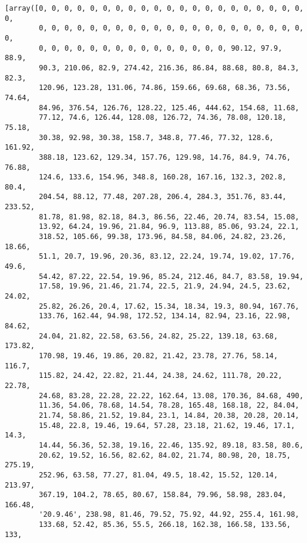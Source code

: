 \documentclass[11pt]{article}
\makeatletter
\newcommand{\boxspacing}{\kern\kvtcb@left@rule\kern\kvtcb@boxsep}
\newcommand{\prompt}[4]{
        {\ttfamily\llap{{\color{#2}[#3]:\hspace{3pt}#4}}\vspace{-\baselineskip}}
    }
\makeatother
\begin{document}
            \begin{tcolorbox}[breakable, size=fbox, boxrule=.5pt, pad at break*=1mm, opacityfill=0]
\prompt{Out}{outcolor}{ }{\boxspacing}
\begin{Verbatim}[commandchars=\\\{\}]
[array([0, 0, 0, 0, 0, 0, 0, 0, 0, 0, 0, 0, 0, 0, 0, 0, 0, 0, 0, 0, 0, 0,
        0, 0, 0, 0, 0, 0, 0, 0, 0, 0, 0, 0, 0, 0, 0, 0, 0, 0, 0, 0, 0, 0,
        0, 0, 0, 0, 0, 0, 0, 0, 0, 0, 0, 0, 0, 0, 0, 90.12, 97.9, 88.9,
        90.3, 210.06, 82.9, 274.42, 216.36, 86.84, 88.68, 80.8, 84.3, 82.3,
        120.96, 123.28, 131.06, 74.86, 159.66, 69.68, 68.36, 73.56, 74.64,
        84.96, 376.54, 126.76, 128.22, 125.46, 444.62, 154.68, 11.68,
        77.12, 74.6, 126.44, 128.08, 126.72, 74.36, 78.08, 120.18, 75.18,
        30.38, 92.98, 30.38, 158.7, 348.8, 77.46, 77.32, 128.6, 161.92,
        388.18, 123.62, 129.34, 157.76, 129.98, 14.76, 84.9, 74.76, 76.88,
        124.6, 133.6, 154.96, 348.8, 160.28, 167.16, 132.3, 202.8, 80.4,
        204.54, 88.12, 77.48, 207.28, 206.4, 284.3, 351.76, 83.44, 233.52,
        81.78, 81.98, 82.18, 84.3, 86.56, 22.46, 20.74, 83.54, 15.08,
        13.92, 64.24, 19.96, 21.84, 96.9, 113.88, 85.06, 93.24, 22.1,
        318.52, 105.66, 99.38, 173.96, 84.58, 84.06, 24.82, 23.26, 18.66,
        51.1, 20.7, 19.96, 20.36, 83.12, 22.24, 19.74, 19.02, 17.76, 49.6,
        54.42, 87.22, 22.54, 19.96, 85.24, 212.46, 84.7, 83.58, 19.94,
        17.58, 19.96, 21.46, 21.74, 22.5, 21.9, 24.94, 24.5, 23.62, 24.02,
        25.82, 26.26, 20.4, 17.62, 15.34, 18.34, 19.3, 80.94, 167.76,
        133.76, 162.44, 94.98, 172.52, 134.14, 82.94, 23.16, 22.98, 84.62,
        24.04, 21.82, 22.58, 63.56, 24.82, 25.22, 139.18, 63.68, 173.82,
        170.98, 19.46, 19.86, 20.82, 21.42, 23.78, 27.76, 58.14, 116.7,
        115.82, 24.42, 22.82, 21.44, 24.38, 24.62, 111.78, 20.22, 22.78,
        24.68, 83.28, 22.28, 22.22, 162.64, 13.08, 170.36, 84.68, 490,
        11.36, 54.06, 78.68, 14.54, 78.28, 165.48, 168.18, 22, 84.04,
        21.74, 58.86, 21.52, 19.84, 23.1, 14.84, 20.38, 20.28, 20.14,
        15.48, 22.8, 19.46, 19.64, 57.28, 23.18, 21.62, 19.46, 17.1, 14.3,
        14.44, 56.36, 52.38, 19.16, 22.46, 135.92, 89.18, 83.58, 80.6,
        20.62, 19.52, 16.56, 82.62, 84.02, 21.74, 80.98, 20, 18.75, 275.19,
        252.96, 63.58, 77.27, 81.04, 49.5, 18.42, 15.52, 120.14, 213.97,
        367.19, 104.2, 78.65, 80.67, 158.84, 79.96, 58.98, 283.04, 166.48,
        '20.9.46', 238.98, 81.46, 79.52, 75.92, 44.92, 255.4, 161.98,
        133.68, 52.42, 85.36, 55.5, 266.18, 162.38, 166.58, 133.56, 133,

\end{Verbatim}
\end{tcolorbox}
\end{document}
